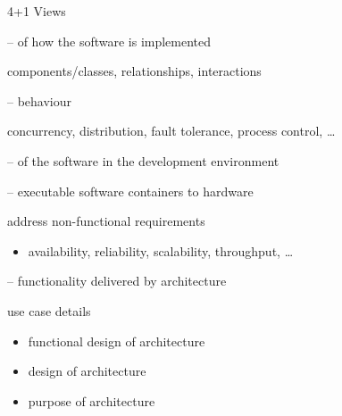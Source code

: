 \documentclass{slide}
\begin{document}
\begin{frame}{4+1 Views}

\Large{
\begin{description}
    \item<1->[Logical] --  of how the software is implemented
    \begin{itemize}
        \large{\item[$\bullet$] components/classes, relationships, interactions}
    \end{itemize}
    \item<2->[Process] --  behaviour
    \begin{itemize}
        \large{\item[$\bullet$] concurrency, distribution, fault tolerance, process control, \ldots}
    \end{itemize}
    \item<3->[Development] --  of the software in the development environment
    \item<4->[Physical] --  executable software containers to hardware
    \begin{itemize}
        \large{\item[$\bullet$] address non-functional requirements}
        \begin{itemize}
            \item[$\bullet$] availability, reliability, scalability, throughput, \ldots
        \end{itemize}
    \end{itemize}
    \item<5->[Scenario] --  functionality delivered by architecture
    \begin{itemize}
        \large{\item[$\bullet$] use case details}
        \begin{itemize}
            \item[$\bullet$]  functional design of architecture
            \item[$\bullet$]  design of architecture
            \item[$\bullet$]  purpose of architecture
        \end{itemize}
    \end{itemize}
\end{description}
}

\end{frame}




\end{document}
